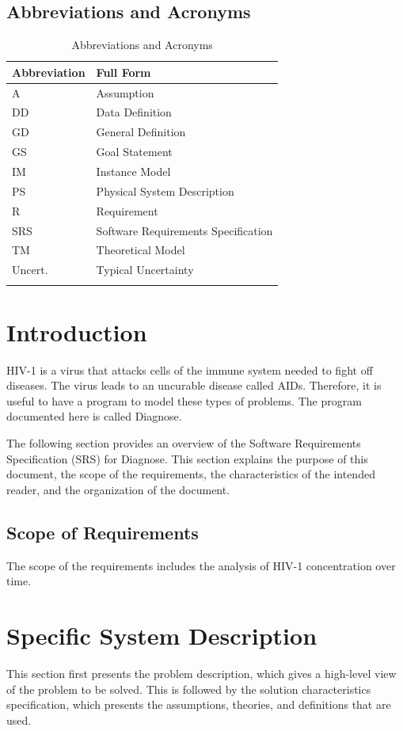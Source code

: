 \documentclass[12pt]{article}
\begin{document}
\subsection{Abbreviations and Acronyms}
\label{Sec:TAbbAcc}
\begin{longtable}{l l}
\toprule
\textbf{Abbreviation} & \textbf{Full Form}
\\
\midrule
\endhead
A & Assumption
\\
DD & Data Definition
\\
GD & General Definition
\\
GS & Goal Statement
\\
IM & Instance Model
\\
PS & Physical System Description
\\
R & Requirement
\\
SRS & Software Requirements Specification
\\
TM & Theoretical Model
\\
Uncert. & Typical Uncertainty
\\
\bottomrule
\caption{Abbreviations and Acronyms}
\label{Table:TAbbAcc}
\end{longtable}
\section{Introduction}
\label{Sec:Intro}
HIV-1 is a virus that attacks cells of the immune system needed to fight off diseases. The virus leads to an uncurable disease called AIDs. Therefore, it is useful to have a program to model these types of problems. The program documented here is called Diagnose.

The following section provides an overview of the Software Requirements Specification (SRS) for Diagnose. This section explains the purpose of this document, the scope of the requirements, the characteristics of the intended reader, and the organization of the document.

\subsection{Scope of Requirements}
\label{Sec:ReqsScope}
The scope of the requirements includes the analysis of HIV-1 concentration over time.

\section{Specific System Description}
\label{Sec:SpecSystDesc}
This section first presents the problem description, which gives a high-level view of the problem to be solved. This is followed by the solution characteristics specification, which presents the assumptions, theories, and definitions that are used.
\end{document}
